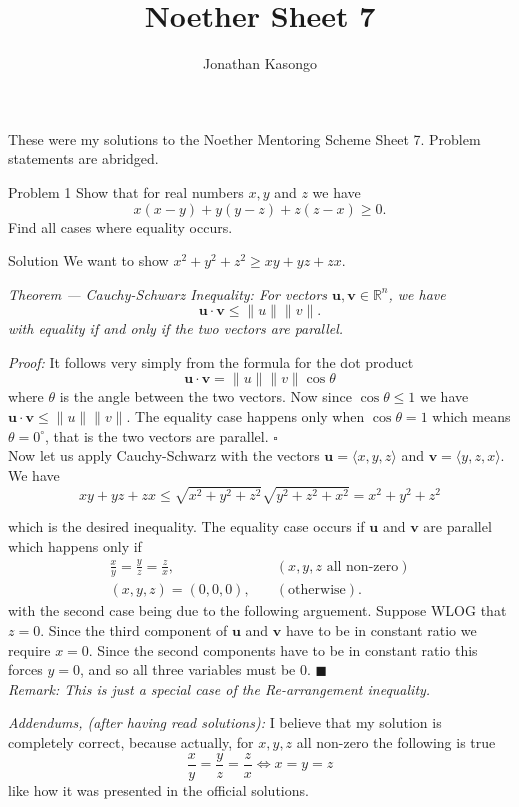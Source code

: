 \documentclass{article}
\author{Jonathan Kasongo}
\title{Noether Sheet 7}
\begin{document}
\maketitle
\centerline{
These were my solutions to the Noether Mentoring Scheme Sheet 7. Problem
statements are abridged.
}

\begin{problem}{Problem 1}
Show that for real numbers $x,y$ and $z$ we have
$$
x(x-y) + y(y-z) + z(z-x) \geq 0.
$$
Find all cases where equality occurs.
\end{problem}

\begin{solution}{Solution}
We want to show
$
x^2 + y^2 + z^2 \geq xy + yz + zx.
$
\vspace{0.2cm}

\textit{Theorem --- Cauchy-Schwarz Inequality:
For vectors $\mathbf{u}, \mathbf{v} \in \mathbb{R}^n$, we have
$$
\mathbf{u} \cdot \mathbf{v} \leq \| u \| \| v \|.
$$
with equality if and only if the two vectors are parallel.
\vspace{0.2cm}
}

\textit{Proof:} It follows very simply from the formula for the dot product
$$
\mathbf{u} \cdot \mathbf{v} = \| u \| \| v \| \cos \theta
$$
where $\theta$ is the angle between the two vectors. Now since
$\cos \theta \leq 1$ we have $\mathbf{u} \cdot \mathbf{v} \leq
\| u \| \| v \|$. The equality case happens only when $\cos \theta = 1$
which means $\theta = 0^\circ$, that is the two vectors are parallel.
$\square$
\\

Now let us apply Cauchy-Schwarz with the vectors
$\mathbf{u} = \langle x,y,z \rangle$ and
$\mathbf{v} = \langle y,z,x \rangle$. We have
$$
xy + yz + zx \leq \sqrt{x^2 + y^2 + z^2}\sqrt{y^2 + z^2 + x^2} =
x^2 + y^2 + z^2
$$

which is the desired inequality. The equality case occurs if
$\mathbf{u}$ and $\mathbf{v}$ are parallel which happens only if
\[
\begin{aligned}
\frac{x}{y} = \frac{y}{z} = \frac{z}{x}, &\quad (x,y,z \text{ all non-zero})
\\
(x,y,z) = (0,0,0), &\quad (\text{otherwise}).
\end{aligned}
\]
with the second case being due to the following arguement. Suppose WLOG that
$z=0$. Since the third component of $\mathbf{u}$ and $\mathbf{v}$ have to
be in constant ratio we require $x = 0$. Since the second components
have to be in constant ratio this forces $y=0$, and so all three variables
must be 0. $\blacksquare$
\\

\textit{Remark: This is just a special case of the Re-arrangement
inequality.}
\\
\hline
\vspace{0.2cm}

\textit{Addendums, (after having read solutions):} I believe that my
solution is completely correct, because actually, for $x,y,z$ all non-zero
the following is true
$$
\frac{x}{y} = \frac{y}{z} = \frac{z}{x} \iff x=y=z
$$
like how it was presented in the official solutions.
\end{solution}
\newpage
\end{document}
